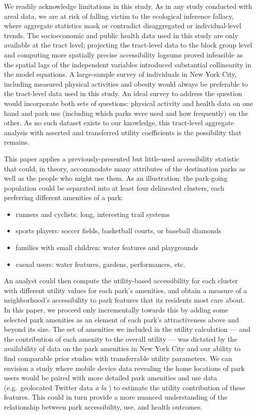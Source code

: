 \documentclass[shortAfour,sageh.bst]{sagej}
\begin{document}
We readily acknowledge limitations in this study. As in any study
conducted with areal data, we are at risk of falling victim to the
ecological inference fallacy, where aggregate statistics mask or
contradict disaggregated or individual-level trends. The socioeconomic
and public health data used in this study are only available at the
tract level; projecting the tract-level data to the block group level
and computing more spatially precise accessibility logsums proved
infeasible as the spatial lags of the independent variables introduced
substantial collinearity in the model equations. A large-sample survey
of individuals in New York City, including measured physical activities
and obesity would always be preferable to the tract-level data used in
this study. An ideal survey to address the question would incorporate
both sets of questions: physical activity and health data on one hand
and park use (including which parks were used and how frequently) on the
other. As no such dataset exists to our knowledge, this tract-level
aggregate analysis with asserted and transferred utility coefficients is
the possibility that remains.

This paper applies a previously-presented but little-used accessibility
statistic that could, in theory, accommodate many attributes of the
destination parks as well as the people who might use them. As an
illustration: the park-going population could be separated into at least
four delineated clusters, each preferring different amenities of a park:

\begin{itemize}
 \item{runners and cyclists: long, interesting trail systems}
 \item{sports players: soccer fields, basketball courts, or baseball diamonds}
 \item{families with small children: water features and playgrounds}
 \item{casual users: water features, gardens, performances, etc.}
\end{itemize}

An analyst could then compute the utility-based accessibility for each
cluster with different utility values for each park's amenities, and
obtain a measure of a neighborhood's accessibility to park features that
its residents most care about. In this paper, we proceed only
incrementally towards this by adding some selected park amenities as an
element of each park's attractiveness above and beyond its size. The set
of amenities we included in the utility calculation --- and the
contribution of each amenity to the overall utility --- was dictated by
the availability of data on the park amenities in New York City and our
ability to find comparable prior studies with transferrable utility
parameters. We can envision a study where mobile device data revealing
the home locations of park users would be paired with more detailed park
amenities and use data (e.g.~geolocated Twitter data \emph{a la}
\citet{roberts2017using}) to estimate the utility contribution of these
features. This could in turn provide a more nuanced understanding of the
relationship between park accessibility, use, and health outcomes.
\end{document}
